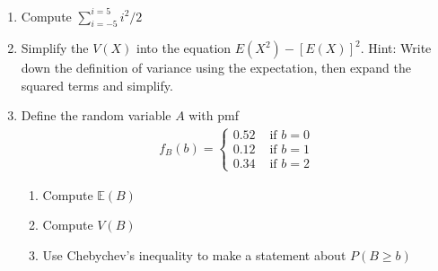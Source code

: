 \begin{enumerate}
    \item Compute $\sum_{i=-5}^{i=5} i^{2}/2$
    
    \item Simplify the $V(X)$ into the equation $E(X^{2}) - \left[E(X)\right]^{2}$. Hint: Write down the definition of variance using the expectation, then expand the squared terms and simplify.
    
    \item Define the random variable $A$ with pmf
    \begin{align}
        f_{B}(b) = \begin{cases}
                      0.52 &\text{ if } b=0\\
                      0.12 &\text{ if } b=1\\
                      0.34 &\text{ if } b=2
                   \end{cases}
    \end{align} 
    \begin{enumerate}
        \item Compute $\mathbb{E}(B)$
        \item Compute $V(B)$
        \item Use Chebychev's inequality to make a statement about $P(B \geq b)$ 
    \end{enumerate}
    

    
\end{enumerate}

